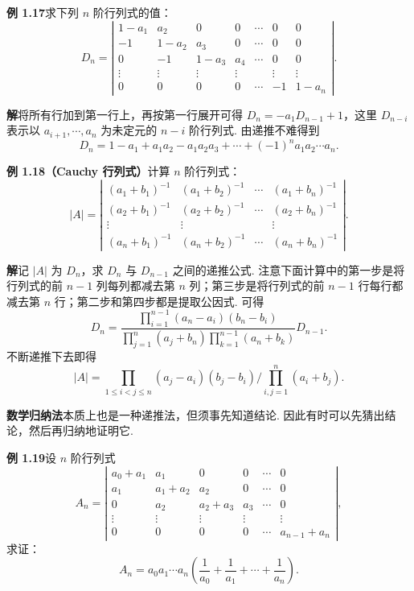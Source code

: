 \documentclass[UTF8, 12pt, fontset=fandol, oneside]{ctexart}
\begin{document}
\noindent\textbf{例 1.17}\quad 求下列 $n$ 阶行列式的值：
\[
D_n=\left|\begin{array}{ccccccc}
1-a_1 & a_2 & 0 & 0 & \cdots & 0 & 0\\
-1 & 1-a_2 & a_3 & 0 & \cdots & 0 & 0\\
0 & -1 & 1-a_3 & a_4 & \cdots & 0 & 0\\
\vdots & \vdots & \vdots & \vdots &        & \vdots & \vdots\\
0 & 0 & 0 & 0 & \cdots & -1 & 1-a_n
\end{array}\right|.
\]

\noindent\textbf{解}\quad 将所有行加到第一行上，再按第一行展开可得 $D_n=-a_1D_{n-1}+1$，这里 $D_{n-i}$ 表示以 $a_{i+1},\cdots,a_n$ 为未定元的 $n-i$ 阶行列式. 由递推不难得到
\[
D_n=1-a_1+a_1a_2-a_1a_2a_3+\cdots+(-1)^na_1a_2\cdots a_n.
\]

\noindent\textbf{例 1.18（Cauchy 行列式）}\quad 计算 $n$ 阶行列式：
\[
|A|=\left|\begin{array}{cccc}
(a_1+b_1)^{-1} & (a_1+b_2)^{-1} & \cdots & (a_1+b_n)^{-1}\\
(a_2+b_1)^{-1} & (a_2+b_2)^{-1} & \cdots & (a_2+b_n)^{-1}\\
\vdots & \vdots &        & \vdots\\
(a_n+b_1)^{-1} & (a_n+b_2)^{-1} & \cdots & (a_n+b_n)^{-1}
\end{array}\right|.
\]

\noindent\textbf{解}\quad 记 $|A|$ 为 $D_n$，求 $D_n$ 与 $D_{n-1}$ 之间的递推公式. 注意下面计算中的第一步是将行列式的前 $n-1$ 列每列都减去第 $n$ 列；第三步是将行列式的前 $n-1$ 行每行都减去第 $n$ 行；第二步和第四步都是提取公因式. 可得
\[
D_n=
\frac{\prod_{i=1}^{n-1}(a_n-a_i)(b_n-b_i)}
{\prod_{j=1}^n(a_j+b_n)\prod_{k=1}^{n-1}(a_n+b_k)}D_{n-1}.
\]
不断递推下去即得
\[
|A|=\prod_{1\le i<j\le n}(a_j-a_i)(b_j-b_i)\bigg/
\prod_{i,j=1}^n(a_i+b_j).
\]

\noindent\textbf{数学归纳法}\quad 本质上也是一种递推法，但须事先知道结论. 因此有时可以先猜出结论，然后再归纳地证明它.

\noindent\textbf{例 1.19}\quad 设 $n$ 阶行列式
\[
A_n=\left|\begin{array}{cccccc}
a_0+a_1 & a_1 & 0 & 0 & \cdots & 0\\
a_1 & a_1+a_2 & a_2 & 0 & \cdots & 0\\
0 & a_2 & a_2+a_3 & a_3 & \cdots & 0\\
\vdots & \vdots & \vdots & \vdots &        & \vdots\\
0 & 0 & 0 & 0 & \cdots & a_{n-1}+a_n
\end{array}\right|,
\]
求证：
\[
A_n=a_0a_1\cdots a_n\left(\frac1{a_0}+\frac1{a_1}+\cdots+\frac1{a_n}\right).
\]
\end{document}
